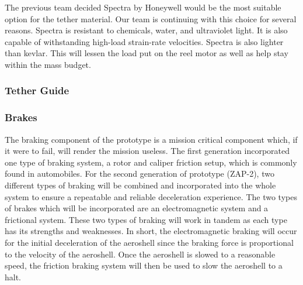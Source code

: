 \begin{table}[H]
\caption{\label{tab:tether_01}Tether materials and properties.}
\centering
\end{table}

The previous team decided Spectra by Honeywell would be the most suitable option for the tether material. Our team is continuing with this choice for several reasons. Spectra is resistant to chemicals, water, and ultraviolet light. It is also capable of withstanding high-load strain-rate velocities. Spectra is also lighter than kevlar. This will lessen the load put on the reel motor as well as help stay within the mass budget.

\subsubsection{Tether Guide}


\subsubsection{Brakes}

\indent\indent The braking component of the prototype is a mission critical component which, if it were to fail, will render the mission useless. The first generation incorporated one type of braking system, a rotor and caliper friction setup, which is commonly found in automobiles. For the second generation of prototype (ZAP-2), two different types of braking will be combined and incorporated into the whole system to ensure a repeatable and reliable deceleration experience. The two types of brakes which will be incorporated are an electromagnetic system and a frictional system. These two types of braking will work in tandem as each type has its strengths and weaknesses. In short, the electromagnetic braking will occur for the initial deceleration of the aeroshell since the braking force is proportional to the velocity of the aeroshell. Once the aeroshell is slowed to a reasonable speed, the friction braking system will then be used to slow the aeroshell to a halt.

